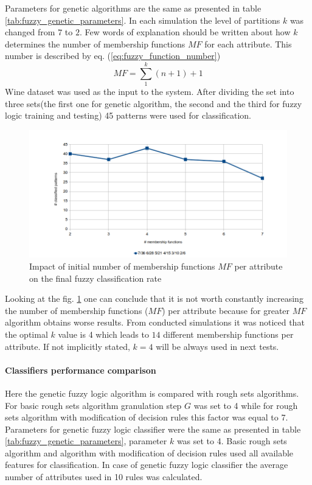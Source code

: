 Parameters for genetic algorithms are the same as presented in table \ref{tab:fuzzy_genetic_parameters}. 
In each simulation the level of partitions $k$ was changed from $7$ to $2$. Few words of explanation should be
written about how $k$ determines the number of membership functions $MF$ for each
attribute. This number is described by eq. (\ref{eq:fuzzy_function_number})
\begin{equation}
    MF = \sum\limits_1^k (n + 1) + 1
    \label{eq:fuzzy_function_number}
\end{equation}
Wine dataset was used as the input to the system. After dividing the set into
three sets(the first one for genetic algorithm, the second and the third for
fuzzy logic training and testing) 45 patterns were used for classification. 

\begin{figure}[H]
    \begin{center}
        \includegraphics[width=\textwidth]{fig/fuzzy_functions.png}
    \end{center}
    \caption{Impact of initial number of membership functions $MF$ per attribute on
    the final fuzzy classification rate}
    \label{fig:fuzzy_functions}
\end{figure}
Looking at the fig. \ref{fig:fuzzy_functions} one can conclude that it is not
worth constantly increasing the number of membership functions ($MF$) per attribute
because for greater $MF$ algorithm obtains worse results. From conducted simulations 
it was noticed that the optimal $k$ value is 4 which leads to $14$
different membership functions per attribute. If not implicitly stated, $k=4$
will be always used in next tests.

\paragraph{Classifiers performance comparison}
Here the genetic fuzzy logic algorithm is compared with rough sets algorithms.
For basic rough sets algorithm granulation step $G$ was set to 4 while for
rough sets algorithm with modification of decision rules this factor was equal
to 7. Parameters for genetic fuzzy logic classifier were the same as presented
in table \ref{tab:fuzzy_genetic_parameters}, parameter $k$ was set to 4. Basic
rough sets algorithm and algorithm with modification of decision rules used all
available features for classification. In case of genetic fuzzy logic
classifier the average number of attributes used in 10 rules was calculated.

